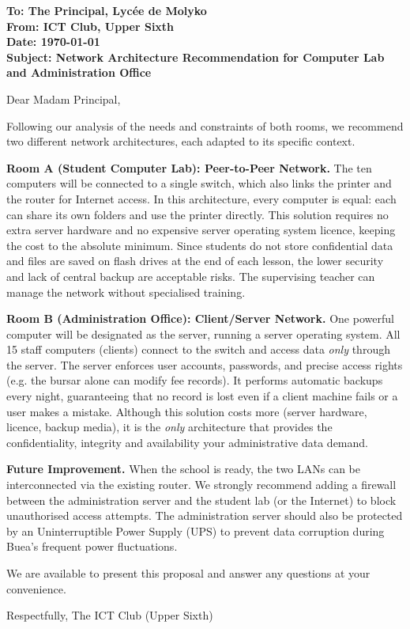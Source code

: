 \documentclass[11pt]{article}
\newcommand{\cle}[1]{{\popxbold\color{popdark}#1}}
\begin{document}
\begin{exemplebox}
\textbf{To: The Principal, Lyc\'ee de Molyko}\\
\textbf{From: ICT Club, Upper Sixth}\\
\textbf{Date: \today}\\
\textbf{Subject: Network Architecture Recommendation for Computer Lab and Administration Office}

Dear Madam Principal,

Following our analysis of the needs and constraints of both rooms, we recommend two different network architectures, each adapted to its specific context.

\textbf{Room A (Student Computer Lab): Peer-to-Peer Network.}
The ten computers will be connected to a single switch, which also links the printer and the router for Internet access. In this architecture, every computer is equal: each can share its own folders and use the printer directly. This solution requires no extra server hardware and no expensive server operating system licence, keeping the cost to the absolute minimum. Since students do not store confidential data and files are saved on flash drives at the end of each lesson, the lower security and lack of central backup are acceptable risks. The supervising teacher can manage the network without specialised training.

\textbf{Room B (Administration Office): Client/Server Network.}
One powerful computer will be designated as the server, running a server operating system. All 15 staff computers (clients) connect to the switch and access data \emph{only} through the server. The server enforces user accounts, passwords, and precise access rights (e.g. the bursar alone can modify fee records). It performs automatic backups every night, guaranteeing that no record is lost even if a client machine fails or a user makes a mistake. Although this solution costs more (server hardware, licence, backup media), it is the \emph{only} architecture that provides the confidentiality, integrity and availability your administrative data demand.

\textbf{Future Improvement.}
When the school is ready, the two LANs can be interconnected via the existing router. We strongly recommend adding a \cle{firewall} between the administration server and the student lab (or the Internet) to block unauthorised access attempts. The administration server should also be protected by an \cle{Uninterruptible Power Supply (UPS)} to prevent data corruption during Buea's frequent power fluctuations.

We are available to present this proposal and answer any questions at your convenience.

Respectfully,
The ICT Club (Upper Sixth)
\end{exemplebox}
\end{document}
